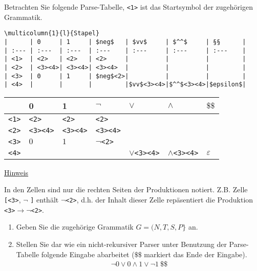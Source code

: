\documentclass{uebungsblatt}
\begin{document}
\begin{aufgabe}
\medskip
Betrachten Sie folgende Parse-Tabelle, \texttt{<1>} ist das Startsymbol
der zugehörigen Grammatik.

\bigskip
\begin{cut}
\markdown
\begin{lstlisting}[basicstyle=\ttfamily\footnotesize] \multicolumn{1}{l}{Stapel} 
|      | 0     | 1     | $neg$   | $vv$     | $^^$     | §§      |
| :--- | :---  | :---  | :---    | :---     | :---     | :---    |
| <1>  | <2>   | <2>   | <2>     |          |          |         |
| <2>  | <3><4>| <3><4>| <3><4>  |          |          |         |
| <3>  | 0     | 1     | $neg$<2>|          |          |         |
| <4>  |       |       |         |$vv$<3><4>|$^^$<3><4>|$epsilon$|
\end{lstlisting}

\medskip
\end{cut}
\begin{center}
            \begin{tabular}{l|l|l|l|l|l|l}
    		 & 0 & 1 & $\neg$ & $\lor$ & $\land$ & $\$\$$ \\
    		\hline
    		\verb|<1>| & \verb|<2>| & \verb|<2>| & \verb|<2>| & & & \\
    		\verb|<2>| & \verb|<3><4>| & \verb|<3><4>| & \verb|<3><4>| & & & \\
    		\verb|<3>| & $0$ & $1$ & $\neg$\verb|<2>| & & & \\
    		\verb|<4>| &  &  &  & $\lor$\verb|<3><4>| & $\land$\verb|<3><4>| & $\varepsilon$ \\
    	    \end{tabular}
\end{center}


\underline{Hinweis}

\smallskip
In den Zellen sind nur die rechten Seiten der Produktionen notiert.
Z.B. Zelle \verb|[<3>|, $\neg$ \verb|]| enthält $\neg$\verb|<2>|, 
d.h. der Inhalt dieser Zelle repäsentiert die Produktion 
\verb|<3>|$\rightarrow \neg$\verb|<2>|.


\begin{enumerate}
\item
Geben Sie die zugehörige Grammatik $G = (N, T, S, P\}$ an.\\

\item

Stellen Sie dar wie ein nicht-rekursiver Parser unter Benutzung der 
Parse-Tabelle folgende Eingabe abarbeitet
($\$\$$ markiert das Ende der Eingabe).
\begin{align*}
\neg 0 \vee 0 \wedge 1 \vee \neg 1\ \$\$
\end{align*}


\end{enumerate}
\end{aufgabe}
\end{document}
